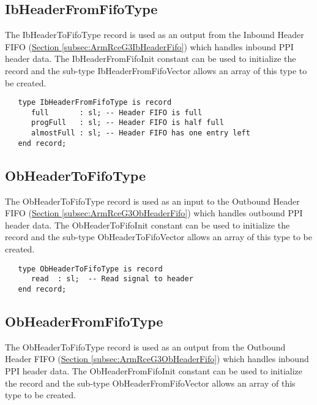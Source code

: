 \documentclass[11pt]{article}
\begin{document}
\subsection{IbHeaderFromFifoType}
\label{subsec:IbHeaderFromFifoType}

The IbHeaderToFifoType record is used as an output from the Inbound Header FIFO (\hyperref[subsec:ArmRceG3IbHeaderFifo]{Section \ref*{subsec:ArmRceG3IbHeaderFifo}}) which handles inbound PPI header data. 
The IbHeaderFromFifoInit constant can be used to initialize the record and the sub-type IbHeaderFromFifoVector allows an array of this type to be created.

\small
\begin{verbatim}
   type IbHeaderFromFifoType is record
      full       : sl; -- Header FIFO is full
      progFull   : sl; -- Header FIFO is half full
      almostFull : sl; -- Header FIFO has one entry left
   end record;
\end{verbatim}
\normalsize

\subsection{ObHeaderToFifoType}
\label{subsec:ObHeaderToFifoType}

The ObHeaderToFifoType record is used as an input to the Outbound Header FIFO (\hyperref[subsec:ArmRceG3ObHeaderFifo]{Section \ref*{subsec:ArmRceG3ObHeaderFifo}}) which handles outbound PPI header data. 
The ObHeaderToFifoInit constant can be used to initialize the record and the sub-type ObHeaderToFifoVector allows an array of this type to be created.

\small
\begin{verbatim}
   type ObHeaderToFifoType is record
      read  : sl;  -- Read signal to header
   end record;
\end{verbatim}
\normalsize

\subsection{ObHeaderFromFifoType}
\label{subsec:ObHeaderFromFifoType}

The ObHeaderToFifoType record is used as an output from the Outbound Header FIFO (\hyperref[subsec:ArmRceG3ObHeaderFifo]{Section \ref*{subsec:ArmRceG3ObHeaderFifo}}) which handles inbound PPI header data. 
The ObHeaderFromFifoInit constant can be used to initialize the record and the sub-type ObHeaderFromFifoVector allows an array of this type to be created.
\end{document}
